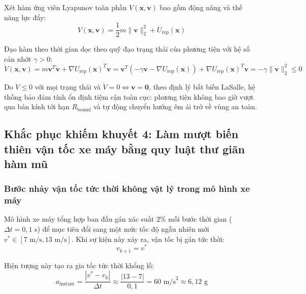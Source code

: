 \hspace{0.5cm} Xét hàm ứng viên Lyapunov toàn phần $V(\mathbf{x}, \mathbf{v})$ bao gồm động năng và thế năng lực đẩy:
\begin{equation}
V(\mathbf{x}, \mathbf{v}) = \frac{1}{2} m \|\mathbf{v}\|_2^2 + U_{\text{rep}}(\mathbf{x})
\label{eq:lyapunov-candidate-function}
\end{equation}

Đạo hàm theo thời gian dọc theo quỹ đạo trạng thái của phương tiện với hệ số cản nhớt $\gamma > 0$:
\begin{equation}
\dot{V}(\mathbf{x}, \mathbf{v}) = m \mathbf{v}^T \dot{\mathbf{v}} + \nabla U_{\text{rep}}(\mathbf{x})^T \mathbf{v} = \mathbf{v}^T (-\gamma \mathbf{v} - \nabla U_{\text{rep}}(\mathbf{x})) + \nabla U_{\text{rep}}(\mathbf{x})^T \mathbf{v} = -\gamma \|\mathbf{v}\|_2^2 \le 0
\label{eq:lyapunov-derivative-negative}
\end{equation}

Do $\dot{V} \le 0$ với mọi trạng thái và $\dot{V} = 0 \iff \mathbf{v} = \mathbf{0}$, theo định lý bất biến LaSalle, hệ thống bảo đảm tính ổn định tiệm cận toàn cục: phương tiện không bao giờ vượt qua bán kính tới hạn $R_{\text{bound}}$ và tự động chuyển hướng êm ái trở về vùng an toàn.

\subsection{Khắc phục khiếm khuyết 4: Làm mượt biến thiên vận tốc xe máy bằng quy luật thư giãn hàm mũ}

\subsubsection{Bước nhảy vận tốc tức thời không vật lý trong mô hình xe máy}

\hspace{0.5cm} Mô hình xe máy tổng hợp ban đầu gán xác suất $2\%$ mỗi bước thời gian ($\Delta t = 0{,}1$ s) để mục tiêu đổi sang một mức tốc độ ngẫu nhiên mới $v^* \in [7\text{ m/s}, 13\text{ m/s}]$. Khi sự kiện này xảy ra, vận tốc bị gán tức thời:
\begin{equation}
v_{k+1} = v^*
\end{equation}

Hiện tượng này tạo ra gia tốc tức thời khổng lồ:
\begin{equation}
a_{\text{instant}} = \frac{|v^* - v_k|}{\Delta t} \approx \frac{|13 - 7|}{0{,}1} = 60\text{ m/s}^2 \approx 6{,}12\text{ g}
\label{eq:unphysical-motorcycle-accel}
\end{equation}

